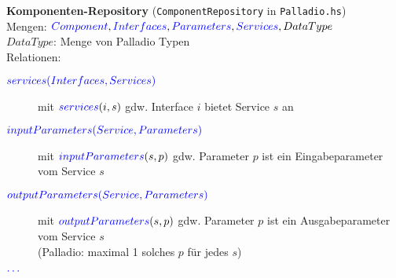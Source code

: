 \documentclass[varwidth=20cm]{standalone}
\begin{document}
\textbf{Komponenten-Repository} (\texttt{ComponentRepository} in \texttt{Palladio.hs})\\

Mengen: ${\color{blue}{Component}}, {\color{blue}{Interfaces}}, {\color{blue}{Parameters}}, {\color{blue}{Services}}, DataType$ \\

$DataType$: Menge von Palladio Typen \\

Relationen:
\begin{description}
  \item[${\color{blue}{services(Interfaces, Services)}}$]
        mit ${\color{blue}{services}}(i, s)$ gdw. Interface $i$ bietet Service $s$ an
  \item[${\color{blue}{inputParameters(Service, Parameters)}}$]
        mit ${\color{blue}{inputParameters}}(s, p)$ gdw. Parameter $p$ ist ein Eingabeparameter vom Service $s$
  \item[${\color{blue}{outputParameters(Service, Parameters)}}$]
        mit ${\color{blue}{outputParameters}}(s, p)$ gdw. Parameter $p$ ist ein Ausgabeparameter vom Service $s$ \\
        (Palladio: maximal 1 solches $p$ für jedes $s$)
  \item[${\color{blue}{\ldots}}$]
\end{description}
\end{document}
